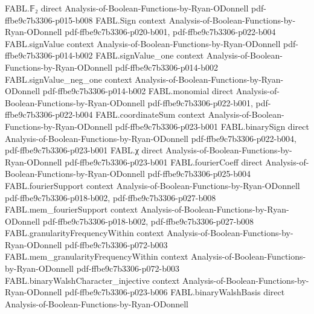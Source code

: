\begin{theorem}
\label{FABL.binaryWalshBasis_repr_eq_binaryFourierCoeff}
\leanok
{}
\proofstep
  {FABL.𝔽₂}
  {direct}
  {Analysis-of-Boolean-Functions-by-Ryan-ODonnell}
  {pdf-ffbe9c7b3306-p015-b008}
\proofstep
  {FABL.Sign}
  {context}
  {Analysis-of-Boolean-Functions-by-Ryan-ODonnell}
  {pdf-ffbe9c7b3306-p020-b001,
    pdf-ffbe9c7b3306-p022-b004}
\proofstep
  {FABL.signValue}
  {context}
  {Analysis-of-Boolean-Functions-by-Ryan-ODonnell}
  {pdf-ffbe9c7b3306-p014-b002}
\proofstep
  {FABL.signValue_one}
  {context}
  {Analysis-of-Boolean-Functions-by-Ryan-ODonnell}
  {pdf-ffbe9c7b3306-p014-b002}
\proofstep
  {FABL.signValue_neg_one}
  {context}
  {Analysis-of-Boolean-Functions-by-Ryan-ODonnell}
  {pdf-ffbe9c7b3306-p014-b002}
\proofstep
  {FABL.monomial}
  {direct}
  {Analysis-of-Boolean-Functions-by-Ryan-ODonnell}
  {pdf-ffbe9c7b3306-p022-b001,
    pdf-ffbe9c7b3306-p022-b004}
\proofstep
  {FABL.coordinateSum}
  {context}
  {Analysis-of-Boolean-Functions-by-Ryan-ODonnell}
  {pdf-ffbe9c7b3306-p023-b001}
\proofstep
  {FABL.binarySign}
  {direct}
  {Analysis-of-Boolean-Functions-by-Ryan-ODonnell}
  {pdf-ffbe9c7b3306-p022-b004,
    pdf-ffbe9c7b3306-p023-b001}
\proofstep
  {FABL.χ}
  {direct}
  {Analysis-of-Boolean-Functions-by-Ryan-ODonnell}
  {pdf-ffbe9c7b3306-p023-b001}
\proofstep
  {FABL.fourierCoeff}
  {direct}
  {Analysis-of-Boolean-Functions-by-Ryan-ODonnell}
  {pdf-ffbe9c7b3306-p025-b004}
\proofstep
  {FABL.fourierSupport}
  {context}
  {Analysis-of-Boolean-Functions-by-Ryan-ODonnell}
  {pdf-ffbe9c7b3306-p018-b002,
    pdf-ffbe9c7b3306-p027-b008}
\proofstep
  {FABL.mem_fourierSupport}
  {context}
  {Analysis-of-Boolean-Functions-by-Ryan-ODonnell}
  {pdf-ffbe9c7b3306-p018-b002,
    pdf-ffbe9c7b3306-p027-b008}
\proofstep
  {FABL.granularityFrequencyWithin}
  {context}
  {Analysis-of-Boolean-Functions-by-Ryan-ODonnell}
  {pdf-ffbe9c7b3306-p072-b003}
\proofstep
  {FABL.mem_granularityFrequencyWithin}
  {context}
  {Analysis-of-Boolean-Functions-by-Ryan-ODonnell}
  {pdf-ffbe9c7b3306-p072-b003}
\proofstep
  {FABL.binaryWalshCharacter_injective}
  {context}
  {Analysis-of-Boolean-Functions-by-Ryan-ODonnell}
  {pdf-ffbe9c7b3306-p023-b006}
\proofstep
  {FABL.binaryWalshBasis}
  {direct}
  {Analysis-of-Boolean-Functions-by-Ryan-ODonnell}

\end{theorem}
